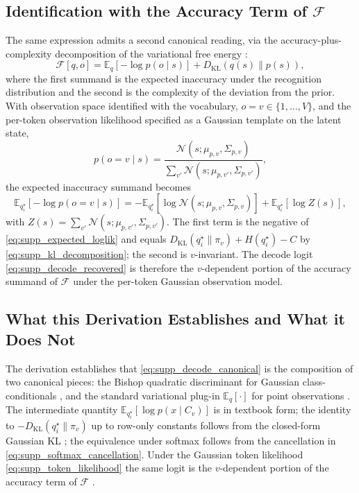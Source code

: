 \documentclass[twoside,11pt]{article}
\begin{document}
\subsection{Identification with the Accuracy Term of $\mathcal{F}$}

The same expression admits a second canonical reading, via the accuracy-plus-complexity decomposition of the variational free energy \cite{Friston2010,Blei2017}:
\begin{equation}
\mathcal{F}[q,o] = \mathbb{E}_{q}[-\log p(o \mid s)] + D_{\mathrm{KL}}(q(s) \| p(s)),
\label{eq:supp_form3_free_energy}
\end{equation}
where the first summand is the expected inaccuracy under the recognition distribution and the second is the complexity of the deviation from the prior. With observation space identified with the vocabulary, $o = v \in \{1,\dots,V\}$, and the per-token observation likelihood specified as a Gaussian template on the latent state,
\begin{equation}
p(o = v \mid s) = \frac{\mathcal{N}(s;\mu_{p,v}, \Sigma_{p,v})}{\sum_{v'} \mathcal{N}(s;\mu_{p,v'}, \Sigma_{p,v'})},
\label{eq:supp_token_likelihood}
\end{equation}
the expected inaccuracy summand becomes
\begin{equation}
\mathbb{E}_{q_i^{\star}}[-\log p(o = v \mid s)]
=
-\mathbb{E}_{q_i^{\star}}[\log \mathcal{N}(s;\mu_{p,v}, \Sigma_{p,v})]
+ \mathbb{E}_{q_i^{\star}}[\log Z(s)],
\end{equation}
with $Z(s) = \sum_{v'} \mathcal{N}(s;\mu_{p,v'}, \Sigma_{p,v'})$. The first term is the negative of \eqref{eq:supp_expected_loglik} and equals $D_{\mathrm{KL}}(q_i^{\star} \| \pi_v) + H(q_i^{\star}) - C$ by \eqref{eq:supp_kl_decomposition}; the second is $v$-invariant. The decode logit \eqref{eq:supp_decode_recovered} is therefore the $v$-dependent portion of the accuracy summand of $\mathcal{F}$ under the per-token Gaussian observation model.

\subsection{What this Derivation Establishes and What it Does Not}

The derivation establishes that \eqref{eq:supp_decode_canonical} is the composition of two canonical pieces: the Bishop quadratic discriminant for Gaussian class-conditionals \cite[\S4.2.1]{Bishop2006}, and the standard variational plug-in $\mathbb{E}_q[\cdot]$ for point observations \cite{Blei2017}. The intermediate quantity $\mathbb{E}_{q_i^{\star}}[\log p(x \mid C_v)]$ is in textbook form; the identity to $-D_{\mathrm{KL}}(q_i^{\star} \| \pi_v)$ up to row-only constants follows from the closed-form Gaussian KL \cite[App.~B]{Bishop2006}; the equivalence under softmax follows from the cancellation in \eqref{eq:supp_softmax_cancellation}. Under the Gaussian token likelihood \eqref{eq:supp_token_likelihood} the same logit is the $v$-dependent portion of the accuracy term of $\mathcal{F}$ \cite{Friston2010}.
\end{document}
